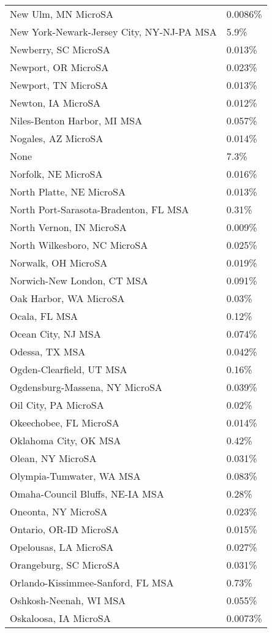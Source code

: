\begin{longtable}[]{@{}ll@{}}
New Ulm, MN MicroSA & 0.0086\% \\
New York-Newark-Jersey City, NY-NJ-PA MSA & 5.9\% \\
Newberry, SC MicroSA & 0.013\% \\
Newport, OR MicroSA & 0.023\% \\
Newport, TN MicroSA & 0.013\% \\
Newton, IA MicroSA & 0.012\% \\
Niles-Benton Harbor, MI MSA & 0.057\% \\
Nogales, AZ MicroSA & 0.014\% \\
None & 7.3\% \\
Norfolk, NE MicroSA & 0.016\% \\
North Platte, NE MicroSA & 0.013\% \\
North Port-Sarasota-Bradenton, FL MSA & 0.31\% \\
North Vernon, IN MicroSA & 0.009\% \\
North Wilkesboro, NC MicroSA & 0.025\% \\
Norwalk, OH MicroSA & 0.019\% \\
Norwich-New London, CT MSA & 0.091\% \\
Oak Harbor, WA MicroSA & 0.03\% \\
Ocala, FL MSA & 0.12\% \\
Ocean City, NJ MSA & 0.074\% \\
Odessa, TX MSA & 0.042\% \\
Ogden-Clearfield, UT MSA & 0.16\% \\
Ogdensburg-Massena, NY MicroSA & 0.039\% \\
Oil City, PA MicroSA & 0.02\% \\
Okeechobee, FL MicroSA & 0.014\% \\
Oklahoma City, OK MSA & 0.42\% \\
Olean, NY MicroSA & 0.031\% \\
Olympia-Tumwater, WA MSA & 0.083\% \\
Omaha-Council Bluffs, NE-IA MSA & 0.28\% \\
Oneonta, NY MicroSA & 0.023\% \\
Ontario, OR-ID MicroSA & 0.015\% \\
Opelousas, LA MicroSA & 0.027\% \\
Orangeburg, SC MicroSA & 0.031\% \\
Orlando-Kissimmee-Sanford, FL MSA & 0.73\% \\
Oshkosh-Neenah, WI MSA & 0.055\% \\
Oskaloosa, IA MicroSA & 0.0073\% \\

\end{longtable}
